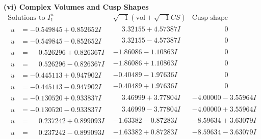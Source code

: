 \documentclass[1p]{elsarticle_modified}
\theoremstyle{definition}
\newcommand{\I}{\sqrt{-1}}
\begin{document}
\newpage\flushleft \textbf{(vi) Complex Volumes and Cusp Shapes}
$$\begin{array}{c|c|c}  
\text{Solutions to }I^u_{1}& \I (\text{vol} + \sqrt{-1}CS) & \text{Cusp shape}\\
 \hline 
\begin{aligned}
u &= -0.549845 + 0.852652 I\end{aligned}
 & \phantom{-}3.32155 + 4.57387 I & \phantom{-0.000000 } 0 \\ \hline\begin{aligned}
u &= -0.549845 - 0.852652 I\end{aligned}
 & \phantom{-}3.32155 - 4.57387 I & \phantom{-0.000000 } 0 \\ \hline\begin{aligned}
u &= \phantom{-}0.526296 + 0.826367 I\end{aligned}
 & -1.86086 - 1.10863 I & \phantom{-0.000000 } 0 \\ \hline\begin{aligned}
u &= \phantom{-}0.526296 - 0.826367 I\end{aligned}
 & -1.86086 + 1.10863 I & \phantom{-0.000000 } 0 \\ \hline\begin{aligned}
u &= -0.445113 + 0.947902 I\end{aligned}
 & -0.40489 - 1.97636 I & \phantom{-0.000000 } 0 \\ \hline\begin{aligned}
u &= -0.445113 - 0.947902 I\end{aligned}
 & -0.40489 + 1.97636 I & \phantom{-0.000000 } 0 \\ \hline\begin{aligned}
u &= -0.130520 + 0.933837 I\end{aligned}
 & \phantom{-}3.46999 + 3.77804 I & -4.00000 - 3.55964 I \\ \hline\begin{aligned}
u &= -0.130520 - 0.933837 I\end{aligned}
 & \phantom{-}3.46999 - 3.77804 I & -4.00000 + 3.55964 I \\ \hline\begin{aligned}
u &= \phantom{-}0.237242 + 0.899093 I\end{aligned}
 & -1.63382 - 0.87283 I & -8.59634 + 3.63079 I \\ \hline\begin{aligned}
u &= \phantom{-}0.237242 - 0.899093 I\end{aligned}
 & -1.63382 + 0.87283 I & -8.59634 - 3.63079 I \\ \hline\begin{aligned}

\end{aligned}
\end{array}$$
\end{document}
